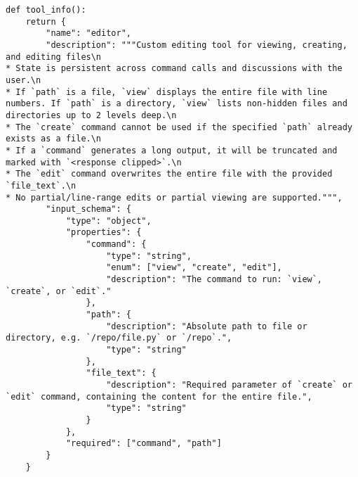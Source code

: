 \begin{lstlisting}
def tool_info():
    return {
        "name": "editor",
        "description": """Custom editing tool for viewing, creating, and editing files\n
* State is persistent across command calls and discussions with the user.\n
* If `path` is a file, `view` displays the entire file with line numbers. If `path` is a directory, `view` lists non-hidden files and directories up to 2 levels deep.\n
* The `create` command cannot be used if the specified `path` already exists as a file.\n
* If a `command` generates a long output, it will be truncated and marked with `<response clipped>`.\n
* The `edit` command overwrites the entire file with the provided `file_text`.\n
* No partial/line-range edits or partial viewing are supported.""",
        "input_schema": {
            "type": "object",
            "properties": {
                "command": {
                    "type": "string",
                    "enum": ["view", "create", "edit"],
                    "description": "The command to run: `view`, `create`, or `edit`."
                },
                "path": {
                    "description": "Absolute path to file or directory, e.g. `/repo/file.py` or `/repo`.",
                    "type": "string"
                },
                "file_text": {
                    "description": "Required parameter of `create` or `edit` command, containing the content for the entire file.",
                    "type": "string"
                }
            },
            "required": ["command", "path"]
        }
    }
\end{lstlisting}